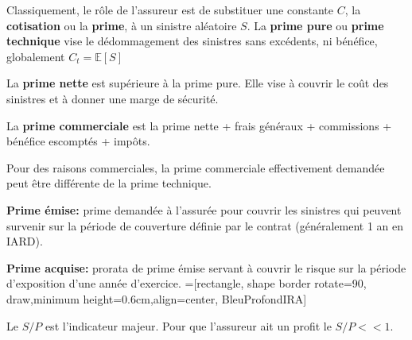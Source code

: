 \begin{f}
Classiquement, le rôle de l'assureur est de substituer une constante $C$, la \textbf{cotisation} ou la \textbf{prime}, à un sinistre aléatoire $S$.
La \textbf{prime pure} ou \textbf{prime technique} vise 
le dédommagement des sinistres sans excédents, ni bénéfice, globalement $C_t = \mathbb{E}[S]$
	
	La \textbf{prime nette} est supérieure à la prime pure. Elle vise à couvrir le coût des sinistres et à donner une marge de sécurité.
	
	La \textbf{prime commerciale} est la prime nette + frais généraux + commissions + bénéfice escomptés + impôts.
	
	Pour des raisons commerciales, la prime commerciale effectivement demandée peut être différente de la prime technique.

	\textbf{Prime émise:} prime demandée à l'assurée pour couvrir les sinistres qui peuvent survenir sur la
période de couverture définie par le contrat (généralement 1 an en IARD).

\textbf{Prime acquise:} prorata de prime émise servant à couvrir le risque sur la période d'exposition
d'une année d'exercice.
=[rectangle, shape border rotate=90, draw,minimum height=0.6cm,align=center, BleuProfondIRA]

\resizebox{\linewidth}{!}
{
}
Le $S/P$ est l'indicateur majeur. Pour que l'assureur ait un profit le $S/P<<1$. 
\end{f}

